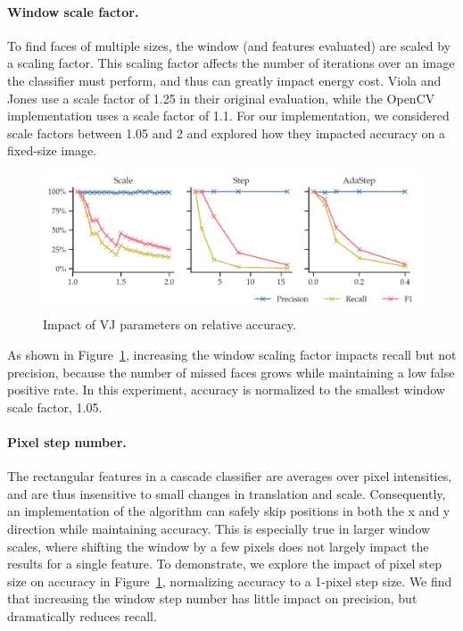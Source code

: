 \paragraph{Window scale factor.}
To find faces of
multiple sizes, the window (and features evaluated) are scaled by a scaling factor. This scaling factor
affects the number of iterations over an image the classifier must perform, and thus can greatly impact
energy cost. Viola and Jones use a scale factor of 1.25 in their original evaluation, while the OpenCV
implementation uses a scale factor of 1.1. For our implementation, we considered scale factors between 1.05
and 2 and explored how they impacted accuracy on a fixed-size image.

\begin{figure}
\noindent
      \includegraphics[width=.8\textwidth,right]{nsp-figs/vj_algo_accuracy2.pdf}
    \caption{Impact of VJ parameters on relative accuracy.}
    \label{fig:vj-accuracy}

\end{figure}

As shown in Figure~\ref{fig:vj-accuracy}, increasing the window scaling factor impacts recall but not precision,
because the number of missed faces grows while maintaining a low false positive rate. In this experiment, accuracy is normalized to the smallest window scale factor, 1.05.

\paragraph{Pixel step number.}
The rectangular features in a cascade classifier are averages over pixel intensities,
and are thus insensitive to small changes in translation and scale. Consequently,
an implementation of the algorithm can safely skip positions in both the x and y direction while
maintaining accuracy. This is especially true in larger window scales, where shifting the window
by a few pixels does not largely impact the results for a single feature.
To demonstrate, we explore the impact of pixel step size on accuracy in Figure~\ref{fig:vj-accuracy}, normalizing
accuracy to a 1-pixel step size.  We find that increasing the window step number has little
impact on precision, but dramatically reduces recall.

